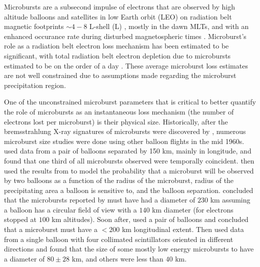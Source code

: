 Microbursts are a subsecond impulse of electrons that are observed by high altitude balloons and satellites in low Earth orbit (LEO) on radiation belt magnetic footprints $\sim 4 - 8$ L-shell (L) \citep[e.g.][]{Anderson1964, Lorentzen2001a, O'Brien2003, Tsurutani2013, Woodger2015, Crew2016, Breneman2017, Mozer2018, Greeley2019}, mostly in the dawn MLTs, and with an enhanced occurance rate during disturbed magnetospheric times \citep{O'Brien2003, Douma2017}. Microburst's role as a radiation belt electron loss mechanism has been estimated to be significant, with total radiation belt electron depletion due to microbursts estimated to be on the order of a day \citep{Lorentzen2001b, O'Brien2004, Thorne2005, Breneman2017}. These average microburst loss estimates are not well constrained due to assumptions made regarding the microburst precipitation region.

One of the unconstrained microburst parameters that is critical to better quantify the role of microbursts as an instantaneous loss mechanism (the number of electrons lost per microburst) is their physical size. Historically, after the bremsstrahlung X-ray signatures of microbursts were discovered by \citet{Anderson1964}, numerous microburst size studies were done using other balloon flights in the mid 1960s. \citet{Brown1965_2} used data from a pair of balloons separated by 150 km, mainly in longitude, and found that one third of all microbursts observed were temporally coincident. \citet{Trefall1966} then used the results from \citet{Brown1965_2} to model the probability that a microburst will be observed by two balloons as a function of the radius of the microburst, radius of the precipitating area a balloon is sensitive to, and the balloon separation. \citet{Trefall1966} concluded that the microbursts reported by  \citet{Brown1965_2} must have had a diameter of $230$ km assuming a balloon has a circular field of view with a $140$ km diameter (for electrons stopped at $100$ km altitudes). Soon after, \citet{Barcus1966} used a pair of balloons and concluded that a microburst must have a $<200$ km longitudinal extent. Then \citet{Parks1967} used data from a single balloon with four collimated scintillators oriented in different directions and found that the size of some mostly low energy microbursts to have a diameter of $80 \pm 28$ km, and others were less than $40$ km. 

